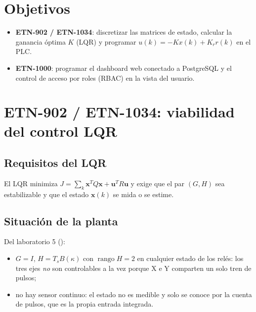 \documentclass[a4paper,11pt]{article}
\begin{document}

\tableofcontents
\newpage


\section{Objetivos}
\begin{itemize}
\item \textbf{ETN-902 / ETN-1034}: discretizar las matrices de estado, calcular la ganancia óptima $K$ (LQR) y programar $u(k) = -Kx(k) + K_r r(k)$ en el PLC.
\item \textbf{ETN-1000}: programar el dashboard web conectado a PostgreSQL y el control de acceso por roles (RBAC) en la vista del usuario.
\end{itemize}

\section{ETN-902 / ETN-1034: viabilidad del control LQR}
\subsection{Requisitos del LQR}
El LQR minimiza $J = \sum_k \mathbf{x}^T Q \mathbf{x} + \mathbf{u}^T R \mathbf{u}$ y exige que el par $(G, H)$ sea estabilizable y que el estado $\mathbf{x}(k)$ se mida o se estime.

\subsection{Situación de la planta}
Del laboratorio 5 ():
\begin{itemize}
\item $G = I$, $H = T_sB(\kappa)$ con $\operatorname{rango} H = 2$ en cualquier estado de los relés: los tres ejes \emph{no} son controlables a la vez porque X e Y comparten un solo tren de pulsos;
\item no hay sensor continuo: el estado no es medible y solo se conoce por la cuenta de pulsos, que es la propia entrada integrada.
\end{itemize}
\end{document}
